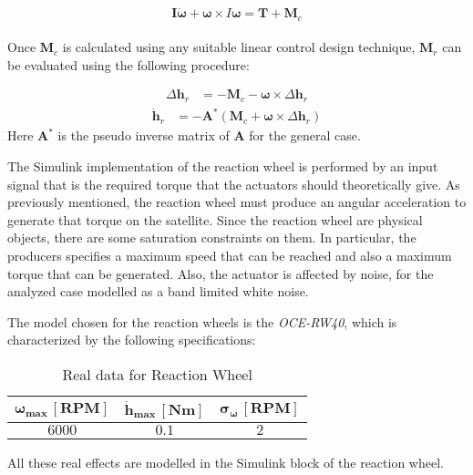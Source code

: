 	\begin{equation*}
		\boldsymbol{I} \dot{\boldsymbol{\omega}} + \boldsymbol{\omega} \times I \boldsymbol{\omega} = \mathbf{T} + \mathbf{M}_c
	\end{equation*}\\
Once \( \mathbf{M}_c \) is calculated using any suitable linear control design technique,  \( \mathbf{M}_r \) can be evaluated using the following procedure:
	
	\begin{align*}
		\Delta \mathbf{h}_r &= -\mathbf{M}_c - \boldsymbol{\omega} \times \Delta \mathbf{h}_r 
	\end{align*}
	\begin{align*}
	\dot{\mathbf{h}}_r &= -\mathbf{A}^* ( \mathbf{M}_c + \boldsymbol{\omega} \times \Delta \mathbf{h}_r )
    \end{align*}
Here \( \mathbf{A}^* \) is the pseudo inverse matrix of \( \mathbf{A} \) for the general case.

The Simulink implementation of the reaction wheel is performed by an input signal that is the required torque that the actuators should theoretically give. As previously mentioned, the reaction wheel must produce an angular acceleration to generate that torque on the satellite. Since the reaction wheel are physical objects, there are some saturation constraints on them. In particular, the producers specifies a maximum speed that can be reached and also a maximum torque that can be generated. Also, the actuator is affected by noise, for the analyzed case modelled as a band limited white noise. 

The model chosen for the reaction wheels is the \textit{OCE-RW40}, which is characterized by the following specifications:

\begin{table}[H]

    \centering
    \begin{tabular}{|c|c|c|}
    \hline
    $\bm{\omega_{max} \, [RPM]}$ & $\bm{\dot{h}_{max} \, [Nm]}$ & $\bm{\sigma_{\omega} \, [RPM]}$ \\
    \hline
    $6000$ & $0.1$ & $2$  \\
    \hline
    \end{tabular}
    
    \caption{Real data for Reaction Wheel}
    \label{table:RW}
    
\end{table}

All these real effects are modelled in the Simulink block of the reaction wheel. 
	
